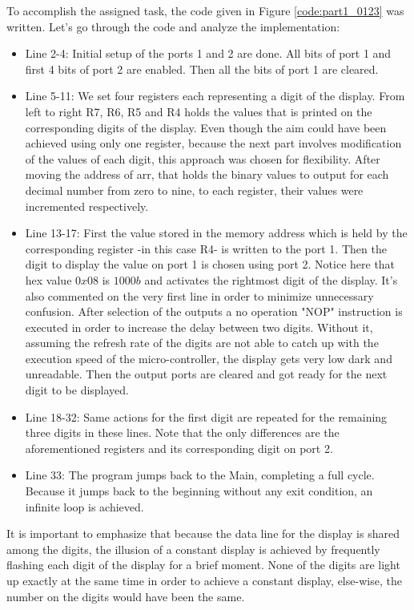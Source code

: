 \documentclass[pdftex,12pt,a4paper]{article}
\begin{document}
To accomplish the assigned task, the code given in Figure \ref{code:part1_0123} was written. Let's go through the code and analyze the implementation:

\begin{itemize}
    \item Line 2-4: Initial setup of the ports 1 and 2 are done. All bits of port 1 and first 4 bits of port 2 are enabled. Then all the bits of port 1 are cleared. 
    \item Line 5-11: We set four registers each representing a digit of the display. From left to right R7, R6, R5 and R4 holds the values that is printed on the corresponding digits of the display. Even though the aim could have been achieved using only one register, because the next part involves modification of the values of each digit, this approach was chosen for flexibility. After moving the address of arr, that holds the binary values to output for each decimal number from zero to nine, to each register, their values were incremented respectively.
    \item Line 13-17: First the value stored in the memory address which is held by the corresponding register -in this case R4- is written to the port 1. Then the digit to display the value on port 1 is chosen using port 2. Notice here that hex value $0x08$ is $1000b$ and activates the rightmost digit of the display. It's also commented on the very first line in order to minimize unnecessary confusion. After selection of the outputs a no operation "NOP" instruction is executed in order to increase the delay between two digits. Without it, assuming the refresh rate of the digits are not able to catch up with the execution speed of the micro-controller, the display gets very low dark and unreadable. Then the output ports are cleared and got ready for the next digit to be displayed.
    \item Line 18-32: Same actions for the first digit are repeated for the remaining three digits in these lines. Note that the only differences are the aforementioned registers and its corresponding digit on port 2.
    \item Line 33: The program jumps back to the Main, completing a full cycle. Because it jumps back to the beginning without any exit condition, an infinite loop is achieved.
\end{itemize}

It is important to emphasize that because the data line for the display is shared among the digits, the illusion of a constant display is achieved by frequently flashing each digit of the display for a brief moment. None of the digits are light up exactly at the same time in order to achieve a constant display, else-wise, the number on the digits would have been the same.
\end{document}
